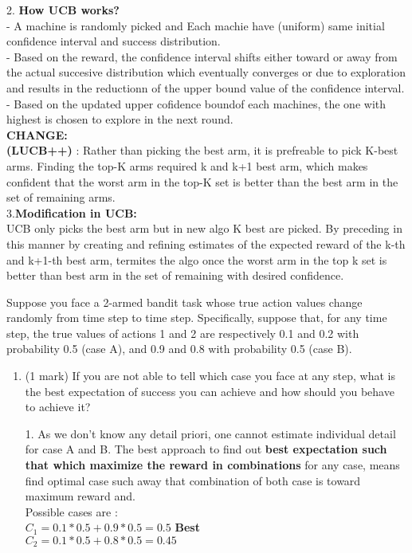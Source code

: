 \documentclass[addpoints,12pt,solution]{exam}
\begin{document}
\begin{questions}
\begin{solution}
2. 
\textbf{How UCB works?} \\
- A machine is randomly picked and Each machie have (uniform) same initial confidence interval and success distribution.  \\
- Based on the reward, the confidence interval shifts either toward or away from the actual succesive distribution which eventually converges or due to exploration and results in the reductionn of the upper bound value of the confidence interval.\\
- Based on the updated upper cofidence boundof each machines, the one with highest is chosen to explore in the next round. \\
\textbf{CHANGE:} \cite{stocha}\\
\textbf{(LUCB++)} : Rather than picking the best arm, it is prefreable to pick K-best arms. Finding the top-K arms required k and k+1 best arm, which makes confident that the worst arm in the top-K set is better than the best arm in the set of remaining arms. \\

3.\textbf{Modification in UCB:} \\
UCB only picks the best arm but in new algo K best are picked. By preceding in this manner by creating and refining estimates of the expected reward of the k-th and k+1-th best arm, termites the algo once the worst arm in the top k set is better than best arm in the set of remaining with desired confidence. 


\end{solution}

\question[3]Suppose you face a 2-armed bandit task whose true action values change randomly from time step to time step. Specifically, suppose that, for any time step, the true values of actions 1 and 2 are respectively 0.1 and 0.2 with probability 0.5 (case A), and 0.9 and 0.8 with probability 0.5 (case B). 

\begin{enumerate}[label=(\alph*)]
    \item (1 mark) If you are not able to tell which case you face at any step, what is the best expectation of success you can achieve and how should you behave to achieve it?
\begin{solution}
1. As we don't know any detail priori, one cannot estimate individual detail for case A and B. The best approach to find out \textbf{best expectation such that which maximize the reward in combinations} for any case, means find optimal case such away that combination of both case is toward maximum reward and.\\
Possible cases are \cite{sutton2018reinforcement}:\\
\textbf{$C_1 = 0.1 *0.5 + 0.9*0.5 = 0.5$} \textbf{Best} \\
$C_2 = 0.1 *0.5 + 0.8*0.5 = 0.45$\\


\end{solution}
\end{enumerate}
\end{questions}
\end{document}
